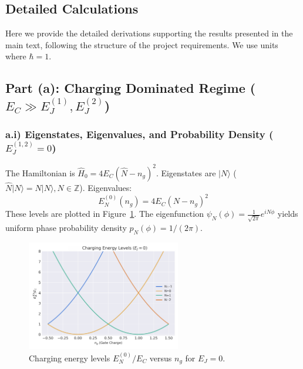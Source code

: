 \documentclass[12pt]{article}
\begin{document}
\newpage 
\begin{appendices}
\section{Detailed Calculations}
\label{app:calculations}

Here we provide the detailed derivations supporting the results presented in the main text, following the structure of the project requirements. We use units where $\hbar=1$.

\subsection[Part (a): Charging Dominated Regime]{Part (a): Charging Dominated Regime ($E_C \gg E_J^{(1)}, E_J^{(2)}$)}
\label{app:part_a}

\subsubsection*{a.i) Eigenstates, Eigenvalues, and Probability Density ($E_J^{(1,2)}=0$)}
\label{app:part_a:subsubsec_i}
The Hamiltonian is $\hat{H}_0 = 4 E_C (\hat{N} - n_g)^2$. Eigenstates are $|N\rangle$ ($\hat{N}|N\rangle = N|N\rangle, N \in \mathbb{Z}$). Eigenvalues:
\begin{equation}
E_N^{(0)}(n_g) = 4 E_C (N - n_g)^2
\label{eq:app_E_N_0_app} 
\end{equation}
These levels are plotted in Figure~\ref{fig:app_charge_levels}. The eigenfunction $\psi_N(\phi) = \frac{1}{\sqrt{2\pi}} e^{i N \phi}$ yields uniform phase probability density $p_N(\phi) = 1/(2\pi)$.

\begin{figure}[htbp]
    \centering
    \includegraphics[width=0.6\textwidth]{fig_charge_levels.png}
    \caption{Charging energy levels $E_N^{(0)}/E_C$ versus $n_g$ for $E_J=0$.}
    \label{fig:app_charge_levels}
\end{figure}


\end{appendices}
\end{document}
